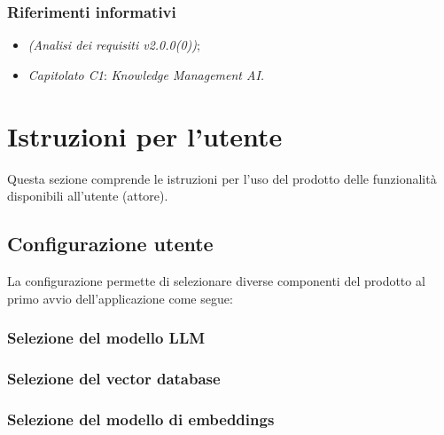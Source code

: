 \documentclass[10pt, a4paper]{article}
\begin{document}
\subsubsection{Riferimenti informativi}
\begin{itemize}
        \item \textit{(Analisi dei requisiti v2.0.0(0))};
        \item \textit{Capitolato C1}: \textit{Knowledge Management AI.}
        \end{itemize}

\newpage

\section{Istruzioni per l'utente}
Questa sezione comprende le istruzioni per l'uso del prodotto delle funzionalità disponibili all'utente (attore).
\subsection{Configurazione utente}
La configurazione permette di selezionare diverse componenti del prodotto al primo avvio dell'applicazione come segue:
\subsubsection{Selezione del modello LLM}
\subsubsection{Selezione del vector database}
\subsubsection{Selezione del modello di embeddings}
\end{document}
